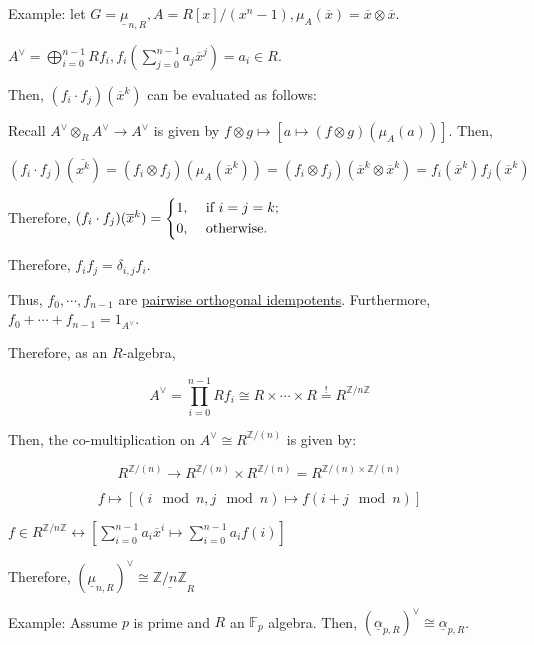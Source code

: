 \documentclass{article}
\theoremstyle{definition}
\numberwithin{theorem}{subsection}
\begin{document}
    Example: let \(G = \underline{\mu}_{n,R}, A = R[x] / (x^n - 1), \mu_A(\overline{x}) = \overline{x} \otimes \overline{x}\).

    \(A^\vee = \bigoplus_{i=0}^{n-1} Rf_i, f_i \left( \sum_{j=0}^{n-1} a_j \overline{x}^j \right) = a_i \in R\).

    Then, \((f_i \cdot f_j)(\overline{x}^k)\) can be evaluated as follows:
    
    Recall \(A^\vee \otimes_R A^\vee \to A^\vee\) is given by \(f \otimes g \mapsto [a \mapsto (f \otimes g)(\mu_A(a))]\). Then,

    \[
        (f_i \cdot f_j)(\overline{x^k}) = (f_i \otimes f_j)(\mu_A(\overline{x}^k)) = (f_i \otimes f_j)(\overline{x}^k \otimes \overline{x}^k) = f_i(\overline{x}^k)f_j(\overline{x}^k)
    \]

    Therefore, \((f_i \cdot f_j)(\overline{x}^k) = \begin{dcases}
        1, &\text{ if } i=j=k ;\\
        0, &\text{ otherwise} .
    \end{dcases}\) 

    Therefore, \(f_i f_j = \delta_{i,j}f_i\).

    Thus, \(f_0, \cdots , f_{n-1}\) are \underline{pairwise orthogonal idempotents}. Furthermore, \(f_0 + \cdots + f_{n-1} = 1_{A^\vee}\).

    Therefore, as an \(R\)-algebra,

    \[
        A^\vee = \prod_{i=0}^{n-1} R f_i \cong R \times \cdots \times R \overset{!}{=} R^{\mathbb{Z} / n\mathbb{Z}}
    \]

    Then, the co-multiplication on \(A^\vee \cong R^{\mathbb{Z} /(n)}\) is given by:

    \[
        R^{\mathbb{Z} / (n)} \to R^{\mathbb{Z} /(n)} \times R^{\mathbb{Z} /(n)} = R^{\mathbb{Z} /(n) \times \mathbb{Z} /(n)} 
    \] 

    \[
        f \mapsto \left[ (i \mod n, j \mod n) \mapsto f(i + j \mod n) \right] 
    \]

    \(f\in R^{\mathbb{Z} / n\mathbb{Z}} \leftrightarrow \left[ \sum_{i=0}^{n-1} a_i \overline{x}^i \mapsto \sum_{i=0}^{n-1} a_i f(i) \right] \) 

    Therefore, \((\underline{\mu}_{n,R})^\vee \cong \underline{\mathbb{Z} / n\mathbb{Z}}_R \)
    
    Example: Assume \(p\) is prime and \(R\) an \(\mathbb{F}_p\) algebra. Then, \((\underline{\alpha}_{p,R})^\vee \cong \underline{\alpha}_{p,R}\).
    
\end{document}
